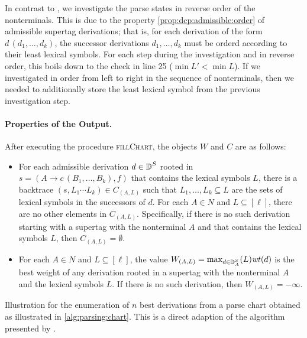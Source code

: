 \documentclass[../../document.tex]{subfiles}
\begin{document}
    In contrast to , we investigate the parse states in reverse order of the  nonterminals.
    This is due to the property \cref{prop:dcp:admissible:order} of admissible  supertag derivations; that is, for each derivation of the form \(d\,(d_1, \ldots, d_k)\), the successor derivations \(d_1, \ldots, d_k\) must be orderd according to their least lexical symbols.
    For each step during the investigation and in reverse order, this boils down to the check in line 25 (\(\min L' < \min L\)).
    If we investigated in order from left to right in the sequence of  nonterminals, then we needed to additionally store the least lexical symbol from the previous investigation step.

    \paragraph{Properties of the Output.} After executing the procedure \textsc{fillChart}, the objects \(W\) and \(C\) are as follows:
    \begin{itemize}
        \item For each admissible derivation \(d \in \operatorname{\mathbb{D}}^S\) rooted in \(s = (A \to c\,(B_1, \ldots, B_k), f)\) that contains the lexical symbols \(L\), there is a backtrace \((s, L_1 \cdots L_k) \in C_{(A, L)}\) such that \(L_1, \ldots, L_k \subseteq L\) are the sets of lexical symbols in the successors of \(d\).
        For each \(A\in N\) and \(L \subseteq [\ell]\), there are no other elements in \(C_{(A,L)}\). Specifically, if there is no such derivation starting with a supertag with the  nonterminal \(A\) and that contains the lexical symbols \(L\), then \(C_{(A,L)} = \emptyset\).
        \item For each \(A \in N\) and \(L \subseteq [\ell]\), the value \(W_{(A, L)} = \max_{d \in \operatorname{\mathbb{D}}^S_A}(L) \mathit{wt}(d)\) is the best weight of any derivation rooted in a supertag with the  nonterminal \(A\) and the lexical symbols \(L\). If there is no such derivation, then \(W_{(A, L)} = -\infty\).
    \end{itemize}

    \begin{algorithm}
        \caption{\label{alg:parsing:deriv}
            Illustration for the enumeration of $n$ best derivations from a parse chart obtained as illustrated in \cref{alg:parsing:chart}.
            This is a direct adaption of the algorithm presented by \citet{HuaChia05}.
        }
        
    \end{algorithm}
\end{document}

